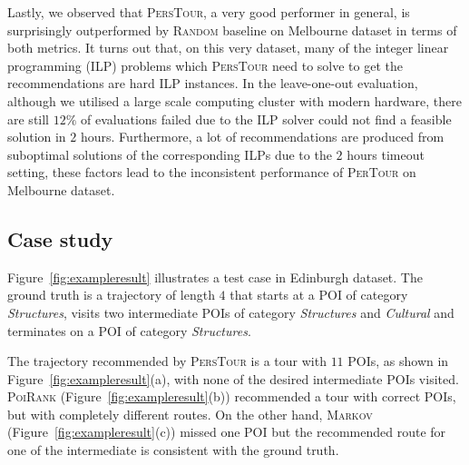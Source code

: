 Lastly, we observed that \textsc{PersTour}, a very good performer in general, is surprisingly outperformed by \textsc{Random} baseline
on Melbourne dataset in terms of both metrics.
It turns out that, on this very dataset, many of the integer linear programming (ILP) problems
which \textsc{PersTour} need to solve to get the recommendations are hard ILP instances.
In the leave-one-out evaluation, although we utilised a large scale computing cluster with modern hardware,
there are still $12\%$ of evaluations failed due to the ILP solver could not find a feasible solution in $2$ hours.
Furthermore, a lot of recommendations are produced from suboptimal solutions of the corresponding ILPs due to
the $2$ hours timeout setting, these factors lead to the inconsistent performance of \textsc{PerTour} on Melbourne dataset.


\subsection{Case study}
\label{sec:casestudy}


Figure~\ref{fig:exampleresult} illustrates a test case in Edinburgh dataset.
The ground truth is a trajectory of length $4$ that starts at a POI of category \textit{Structures},
visits two intermediate POIs of category \textit{Structures} and \textit{Cultural} and 
terminates on a POI of category \textit{Structures}.

The trajectory recommended by \textsc{PersTour} is a tour with $11$ POIs, as shown in Figure~\ref{fig:exampleresult}(a),
with none of the desired intermediate POIs visited.
\textsc{PoiRank} (Figure~\ref{fig:exampleresult}(b)) recommended a tour with correct POIs, but with completely different routes.
On the other hand, \textsc{Markov} (Figure~\ref{fig:exampleresult}(c)) missed one POI but the recommended route for one of 
the intermediate is consistent with the ground truth.

